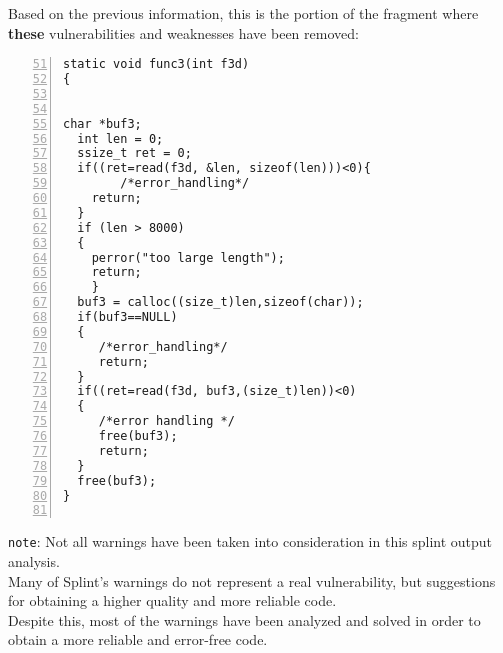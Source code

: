 \documentclass[a4paper,12pt]{article}
\newenvironment{SpecialPar}
  {\begin{shaded}}
  {\end{shaded}}
\begin{document}
\newpage
\noindent
Based on the previous information, this is the portion of the fragment where \textbf{these} vulnerabilities and weaknesses have been removed:
\begin{lstlisting}[style=c,numbers=left,firstnumber=51,linebackgroundcolor={
\ifnum\value{lstnumber}=58\color{green}\fi
\ifnum\value{lstnumber}=68\color{green}\fi
\ifnum\value{lstnumber}=73\color{green}\fi
\ifnum\value{lstnumber}=76\color{green}\fi
\ifnum\value{lstnumber}=79\color{green}\fi}]
static void func3(int f3d)
{
	

char *buf3;
  int len = 0;
  ssize_t ret = 0;
  if((ret=read(f3d, &len, sizeof(len)))<0){
        /*error_handling*/
	return;
  }
  if (len > 8000) 
  { 
  	perror("too large length");
  	return; 
	}
  buf3 = calloc((size_t)len,sizeof(char));
  if(buf3==NULL)
  {
     /*error_handling*/
     return;
  }
  if((ret=read(f3d, buf3,(size_t)len))<0)
  {
     /*error handling */
     free(buf3);
     return;
  }
  free(buf3);        
}


\end{lstlisting}

\begin{SpecialPar}
\noindent
\texttt{note}: Not all warnings have been taken into consideration in this splint output analysis.\\
Many of Splint's warnings do not represent a real vulnerability, but suggestions for obtaining a higher quality and more reliable code.\\
Despite this, most of the warnings have been analyzed and solved in order to obtain a more reliable and error-free code.
\end{SpecialPar}
\end{document}
